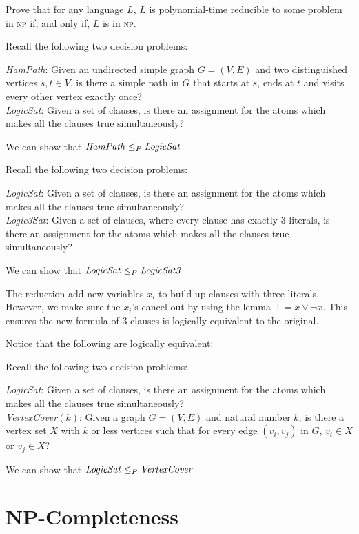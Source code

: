 \begin{example}
Prove that for any language $L$, $L$ is polynomial-time reducible to some problem
in \textsc{np} if, and only if, $L$ is in \textsc{np}.
\end{example}


\frmrule

\begin{example}
Recall the following two decision problems:

\textit{HamPath}: Given an undirected simple graph $G = (V,E)$ 
and two distinguished vertices $s, t \in V$, 
is there a simple path in $G$ that starts at $s$, ends at $t$ 
and visits every other vertex exactly once?\\
\textit{LogicSat}: Given a set of clauses, is there an 
assignment for the atoms which makes all the clauses true simultaneously?

We can show that $\text{\textit{HamPath}} \leq_P \text{\textit{LogicSat}}$
\end{example}

\frmrule

\begin{example}
Recall the following two decision problems:

\textit{LogicSat}: Given a set of clauses, is there an 
assignment for the atoms which makes all the clauses true simultaneously? \\
\textit{Logic3Sat}: Given a set of clauses, where every clause has exactly 3 literals, 
is there an assignment for the atoms which makes all the clauses true simultaneously?

We can show that $\text{\textit{LogicSat}} \leq_P \text{\textit{LogicSat3}}$

\frmrule

The reduction add new variables $x_i$ to build up clauses with three literals.
However, we make sure the  $x_i$'s cancel out by using the lemma $\top = x \vee \neg x$.
This ensures the new formula of 3-clauses is logically equivalent to the original.

Notice that the following are logically equivalent:



\end{example}


\begin{example}
Recall the following two decision problems:

\textit{LogicSat}: Given a set of clauses, is there an 
assignment for the atoms which makes all the clauses true simultaneously? \\
\textit{VertexCover}$(k)$: Given a graph $G = (V,E)$ and natural number $k$, 
is there a vertex set $X$ with $k$ or less vertices such that for 
every edge $(v_i, v_j)$ in $G$, $v_i \in X$ or $v_j \in X$?


We can show that $\text{\textit{LogicSat}} \leq_P \text{\textit{VertexCover}}$


\end{example}






\section{NP-Completeness}

